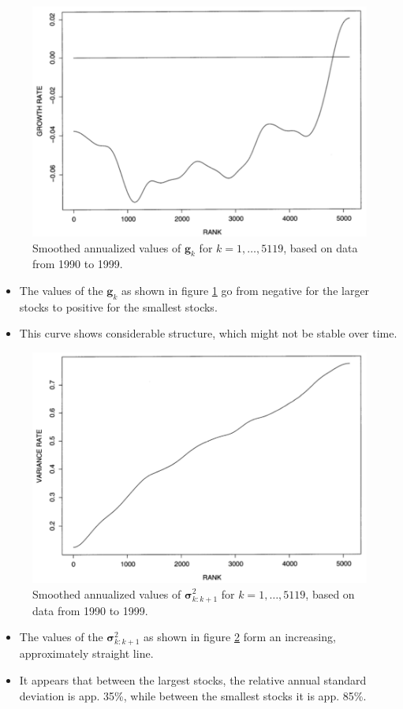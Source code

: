 \documentclass[a4paper,landscape,8pt,fleqn]{scrartcl}
\begin{document}
\begin{multicols*}{3}
\begin{figure}[H]
\centering
\includegraphics[width=0.8 \linewidth]{USGrowthRates}
\caption{Smoothed annualized values of $\pmb{g}_k$ for $k=1, \ldots, 5119$, based on data from 1990 to 1999.}
\label{fig:USGrowthRates}
\end{figure}

\begin{itemize}
\item The values of the $\pmb{g}_k$ as shown in figure \ref{fig:USGrowthRates} go from negative for the larger stocks to positive for the smallest stocks.
\item This curve shows considerable structure, which might not be stable over time.
\end{itemize}

\begin{figure}[H]
\centering
\includegraphics[width=0.8 \linewidth]{USVariances}
\caption{Smoothed annualized values of $\pmb{\sigma}_{k:k+1}^2$ for $k=1, \ldots, 5119$, based on data from 1990 to 1999.}
\label{fig:USVariances}
\end{figure}

\begin{itemize}
\item The values of the $\pmb{\sigma}_{k:k+1}^2$ as shown in figure \ref{fig:USVariances} form an increasing, approximately straight line.
\item It appears that between the largest stocks, the relative annual standard deviation is app. 35\%, while between the smallest stocks it is app. 85\%.
\end{itemize}


\end{multicols*}
\end{document}
